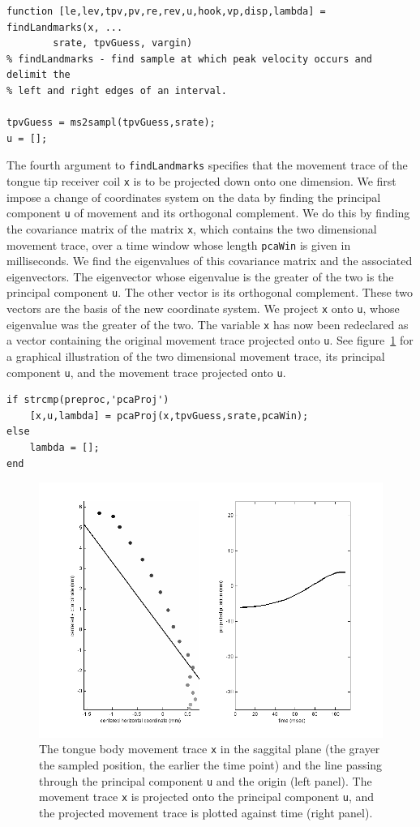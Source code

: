 \documentclass[a4paper, 12pt]{article}
\begin{document}
\begin{verbatim}
function [le,lev,tpv,pv,re,rev,u,hook,vp,disp,lambda] = findLandmarks(x, ...
        srate, tpvGuess, vargin)
% findLandmarks - find sample at which peak velocity occurs and delimit the
% left and right edges of an interval.

tpvGuess = ms2sampl(tpvGuess,srate);
u = [];
\end{verbatim}
The fourth argument to \texttt{findLandmarks} specifies that the movement trace of the tongue tip receiver coil \texttt{x} is to be projected down onto one dimension. 
We first impose a change of coordinates system on the data by finding the principal component \texttt{u} of movement and its orthogonal complement. 
We do this by finding the covariance matrix of the matrix \texttt{x}, which contains the two dimensional movement trace, over a time window whose length \texttt{pcaWin} is given in milliseconds. We find the eigenvalues of this covariance matrix and the associated eigenvectors. The eigenvector whose eigenvalue is the greater of the two is the principal component \texttt{u}. The other vector is its orthogonal complement. These two vectors are the basis of the new coordinate system. We project \texttt{x} onto \texttt{u}, whose eigenvalue was the greater of the two. The variable \texttt{x} has now been redeclared as a vector containing the original movement trace projected onto \texttt{u}. See figure~\ref{fig:projection} for a graphical illustration of the two dimensional movement trace, its principal component \texttt{u}, and the movement trace projected onto \texttt{u}.
\begin{verbatim}
if strcmp(preproc,'pcaProj')
    [x,u,lambda] = pcaProj(x,tpvGuess,srate,pcaWin);
else
    lambda = [];
end
\end{verbatim}
\begin{figure}
\centering
\includegraphics[width=.8\textwidth]{p5.png}
\caption{The tongue body movement trace \texttt{x} in the saggital plane (the grayer the sampled position, the earlier the time point) and the line passing through the principal component \texttt{u} and the origin (left panel). The movement trace \texttt{x} is projected onto the principal component \texttt{u}, and the projected movement trace is plotted against time (right panel).}
\label{fig:projection}
\end{figure}
\end{document}
